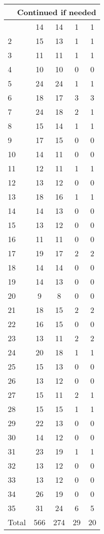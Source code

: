 \begin{center}
\begin{longtable}{l|c|c|c|c}
\hline \multicolumn{5}{|r|}{{Continued if needed}} \\ \hline
\endfoot 
1 & 14 & 14 & 1 & 1\\ \hline
2 & 15 & 13 & 1 & 1\\ \hline
3 & 11 & 11 & 1 & 1\\ \hline
4 & 10 & 10 & 0 & 0\\ \hline
5 & 24 & 24 & 1 & 1\\ \hline
6 & 18 & 17 & 3 & 3\\ \hline
7 & 24 & 18 & 2 & 1\\ \hline
8 & 15 & 14 & 1 & 1\\ \hline
9 & 17 & 15 & 0 & 0\\ \hline
10 & 14 & 11 & 0 & 0\\ \hline
11 & 12 & 11 & 1 & 1\\ \hline
12 & 13 & 12 & 0 & 0\\ \hline
13 & 18 & 16 & 1 & 1\\ \hline
14 & 14 & 13 & 0 & 0\\ \hline
15 & 13 & 12 & 0 & 0\\ \hline
16 & 11 & 11 & 0 & 0\\ \hline
17 & 19 & 17 & 2 & 2\\ \hline
18 & 14 & 14 & 0 & 0\\ \hline
19 & 14 & 13 & 0 & 0\\ \hline
20 & 9 & 8 & 0 & 0\\ \hline
21 & 18 & 15 & 2 & 2\\ \hline
22 & 16 & 15 & 0 & 0\\ \hline
23 & 13 & 11 & 2 & 2\\ \hline
24 & 20 & 18 & 1 & 1\\ \hline
25 & 15 & 13 & 0 & 0\\ \hline
26 & 13 & 12 & 0 & 0\\ \hline
27 & 15 & 11 & 2 & 1\\ \hline
28 & 15 & 15 & 1 & 1\\ \hline
29 & 22 & 13 & 0 & 0\\ \hline
30 & 14 & 12 & 0 & 0\\ \hline
31 & 23 & 19 & 1 & 1\\ \hline
32 & 13 & 12 & 0 & 0\\ \hline
33 & 13 & 12 & 0 & 0\\ \hline
34 & 26 & 19 & 0 & 0\\ \hline
35 & 31 & 24 & 6 & 5\\ \hline
\hline \hline
Total & 566 & 274 & 29 & 20




\end{longtable}
\end{center}

